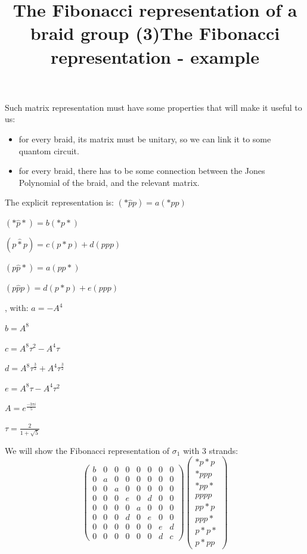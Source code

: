\documentclass{article}
\begin{document}
Such matrix representation must have some properties that will make it useful to us:
\begin{itemize}
\item for every braid, its matrix must be unitary, so we can link it to some quantom circuit.
\item for every braid, there has to be some connection between the Jones Polynomial of the braid, and the relevant matrix.
\end{itemize}
 


\title{The Fibonacci representation of a braid group (3)}
The explicit representation is:
$(*\hat{p}p)=a(*pp)$

$(*\hat{p}*)=b(*p*)$

$(p\hat{*}p)=c(p*p)+d(ppp)$

$(p\hat{p}*)=a(pp*)$

$(p\hat{p}p)=d(p*p)+e(ppp)$

, with:
$ a = -A^{4} $


 $  b = A^{8}  $
 
 $  c = A^{8}\tau^{2} - A^{4}\tau $
  
 $  d = A^{8}\tau^{\frac{3}{2}} + A^{4}\tau^{\frac{3}{2}} $ 
 
 $  e = A^{8}\tau - A^{4}\tau^{2} $ 
 
 $  A = e^{\frac{-3{\pi}i}{5}} $ 
 
 $  \tau = \frac{2}{1 + \sqrt{5}} $


 
\title{The Fibonacci representation - example}
We will show the Fibonacci representation of $\sigma_{1}$ with 3 strands:
\[
\begin{pmatrix} b & 0 & 0 & 0 & 0 & 0 & 0 & 0 \\ 0 & a & 0 & 0 & 0 & 0 & 0 & 0 \\ 0 & 0 & a & 0 & 0 & 0 & 0 & 0 \\ 0 & 0 & 0 & e & 0 & d & 0 & 0 \\ 0 & 0 & 0 & 0 & a & 0 & 0 & 0 \\ 0 & 0 & 0 & d & 0 & e & 0 & 0 \\0 & 0 & 0 & 0 & 0 & 0 & e & d \\0 & 0 & 0 & 0 & 0 & 0 & d & c \end{pmatrix} 
  \begin{pmatrix} *p*p \\ *ppp \\ *pp* \\ pppp \\ pp*p \\ ppp* \\ p*p* \\ p*pp \end{pmatrix}
\]
\end{document}
